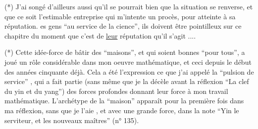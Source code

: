 (*) J'ai songé d'ailleurs aussi qu'il se pourrait bien que la situation se renverse, et que ce soit l'estimable entreprise qui m'intente un procès, pour atteinte à sa réputation.  es gens ``au service de la cience'', ils doivent être pointilleux sur ce chapitre \deleted{\unsure{--}} \inserted{(}du moment que c'est de \uline{leur}  réputation qu'il s'agit ...\inserted{)}.

(*) Cette idée-force de bâtir des ``maisons'', et qui soient bonnes ``pour tous'', a joué un rôle considérable dans mon oeuvre mathématique, et ceci depuis le début des années cinquante déjà. Cela a été l'expression   ce que j'ai appelé la ``pulsion de service'' , qui a fait partie (sans même que je la décèle avant la réflexion ``La clef du yin et du yang'') des  forces profondes donnant leur force  à mon travail mathématique. L'archétype de la ``maison'' apparaît pour la première fois dans ma réflexion,  sans que je l'aie  , et avec une grande force, dans la note ``Yin le serviteur, et les nouveaux maîtres'' (n° 135).
